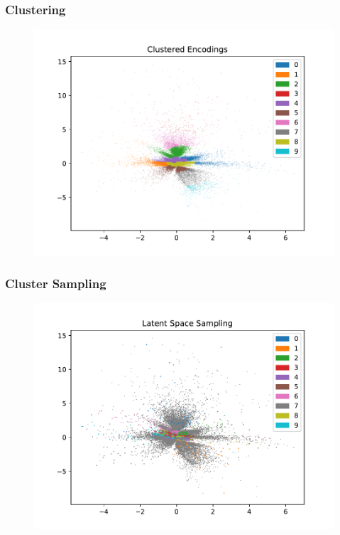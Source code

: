 \documentclass[10pt, usenames, dvipsnames, table]{beamer}
\begin{document}
\begin{frame}
  \frametitle{Clustering}
  \begin{figure}
    \centering
    \includegraphics[width=\linewidth]
    {models/mnist_conv_e300_L2_b64/uniform-cluster_clustered_encodings}
    \caption{}
    \label{}
  \end{figure}
\end{frame}

\begin{frame}
  \frametitle{Cluster Sampling}
  \begin{figure}
    \centering
    \includegraphics[width=\linewidth]
    {models/mnist_conv_e300_L2_b64/uniform-cluster_sampling_1000}
    \caption{}
    \label{}
  \end{figure}
\end{frame}
\end{document}
